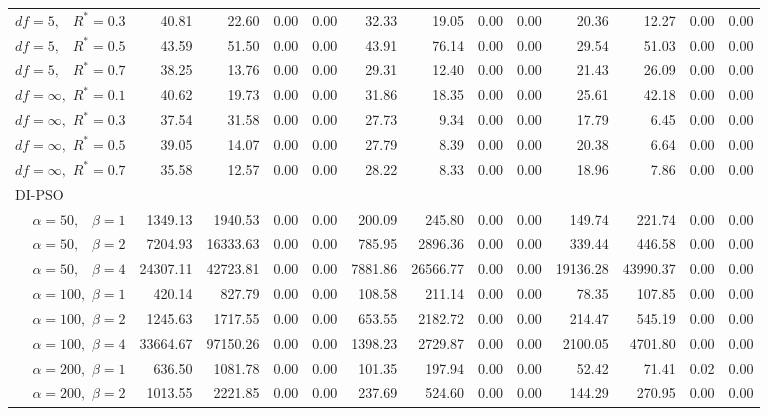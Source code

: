 \documentclass[12pt]{article}
\begin{document}
\begin{table}[ht]
{\begin{tabular}{r|rrrr|rrrr|rrrr}
  $df = 5,\enspace$ $R^* =0.3$ & 40.81 & 22.60 & 0.00 & 0.00 & 32.33 & 19.05 & 0.00 & 0.00 & 20.36 & 12.27 & 0.00 & 0.00 \\ 
  $df = 5,\enspace$ $R^* =0.5$ & 43.59 & 51.50 & 0.00 & 0.00 & 43.91 & 76.14 & 0.00 & 0.00 & 29.54 & 51.03 & 0.00 & 0.00 \\ 
  $df = 5,\enspace$ $R^* =0.7$ & 38.25 & 13.76 & 0.00 & 0.00 & 29.31 & 12.40 & 0.00 & 0.00 & 21.43 & 26.09 & 0.00 & 0.00 \\ 
  $df = \infty,$ $R^* =0.1$ & 40.62 & 19.73 & 0.00 & 0.00 & 31.86 & 18.35 & 0.00 & 0.00 & 25.61 & 42.18 & 0.00 & 0.00 \\ 
  $df = \infty,$ $R^* =0.3$ & 37.54 & 31.58 & 0.00 & 0.00 & 27.73 & 9.34 & 0.00 & 0.00 & 17.79 & 6.45 & 0.00 & 0.00 \\ 
  $df = \infty,$ $R^* =0.5$ & 39.05 & 14.07 & 0.00 & 0.00 & 27.79 & 8.39 & 0.00 & 0.00 & 20.38 & 6.64 & 0.00 & 0.00 \\ 
  $df = \infty,$ $R^* =0.7$ & 35.58 & 12.57 & 0.00 & 0.00 & 28.22 & 8.33 & 0.00 & 0.00 & 18.96 & 7.86 & 0.00 & 0.00 \\ 
\hline
\multicolumn{1}{l|}{DI-PSO} &&&&&&&&&&&&\\
  $\alpha = 50,\enspace$ $\beta =1$ & 1349.13 & 1940.53 & 0.00 & 0.00 & 200.09 & 245.80 & 0.00 & 0.00 & 149.74 & 221.74 & 0.00 & 0.00 \\ 
  $\alpha = 50,\enspace$ $\beta =2$ & 7204.93 & 16333.63 & 0.00 & 0.00 & 785.95 & 2896.36 & 0.00 & 0.00 & 339.44 & 446.58 & 0.00 & 0.00 \\ 
  $\alpha = 50,\enspace$ $\beta =4$ & 24307.11 & 42723.81 & 0.00 & 0.00 & 7881.86 & 26566.77 & 0.00 & 0.00 & 19136.28 & 43990.37 & 0.00 & 0.00 \\ 
  $\alpha = 100,$ $\beta =1$ & 420.14 & 827.79 & 0.00 & 0.00 & 108.58 & 211.14 & 0.00 & 0.00 & 78.35 & 107.85 & 0.00 & 0.00 \\ 
  $\alpha = 100,$ $\beta =2$ & 1245.63 & 1717.55 & 0.00 & 0.00 & 653.55 & 2182.72 & 0.00 & 0.00 & 214.47 & 545.19 & 0.00 & 0.00 \\ 
  $\alpha = 100,$ $\beta =4$ & 33664.67 & 97150.26 & 0.00 & 0.00 & 1398.23 & 2729.87 & 0.00 & 0.00 & 2100.05 & 4701.80 & 0.00 & 0.00 \\ 
  $\alpha = 200,$ $\beta =1$ & 636.50 & 1081.78 & 0.00 & 0.00 & 101.35 & 197.94 & 0.00 & 0.00 & 52.42 & 71.41 & 0.02 & 0.00 \\ 
  $\alpha = 200,$ $\beta =2$ & 1013.55 & 2221.85 & 0.00 & 0.00 & 237.69 & 524.60 & 0.00 & 0.00 & 144.29 & 270.95 & 0.00 & 0.00 \\ 

\end{tabular}}
\end{table}
\end{document}
